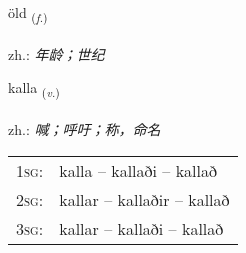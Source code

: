 \documentclass[frontgrid, backgrid]{flacards}\usepackage[]{graphicx}\usepackage[]{xcolor}
\begin{document}
\renewcommand{\blhead}{\vskip5pt {\small\bfseries\footnotesize Nafnorð | 名词 }}
\renewcommand{\bcfoot}{\vskip5pt \hspace{2pt}{\small\bfseries\footnotesize 1K}}


{öld \small{\textsubscript{(\textit{f.})}} \\[1ex] %
\textphonetic{[œlt]} \\
zh.: \emph{年龄；世纪} \\  [2ex]
\renewcommand*{\arraystretch}{0.8}
}

\renewcommand{\flhead}{\vskip5pt \fboxsep=0pt {\small\bfseries\footnotesize Sagnorð | 动词}}
\renewcommand{\fcfoot}{\vskip5pt \fboxsep=0pt \hspace{2pt}{\small\bfseries\footnotesize 1K}}

\renewcommand{\blhead}{\vskip5pt {\small\bfseries\footnotesize Sagnorð | 动词 }}
\renewcommand{\bcfoot}{\vskip5pt \hspace{2pt}{\small\bfseries\footnotesize 1K}}


{kalla \small{\textsubscript{(\textit{v.})}} \\[1ex] %
\textphonetic{[kʰatla]} \\
zh.: \emph{喊；呼吁；称，命名} \\  [2ex]
\renewcommand*{\arraystretch}{0.8}
\begin{tabular}{p{1cm}l}
\textsc{1sg}: & kalla -- kallaði -- kallað \\ 
\textsc{2sg}: & kallar -- kallaðir -- kallað \\ 
\textsc{3sg}: & kallar -- kallaði -- kallað \\ 
\end{tabular}
}

\renewcommand{\flhead}{\vskip5pt \fboxsep=0pt {\small\bfseries\footnotesize Nafnorð | 名词}}
\renewcommand{\fcfoot}{\vskip5pt \fboxsep=0pt \hspace{2pt}{\small\bfseries\footnotesize 1K}}
\end{document}
